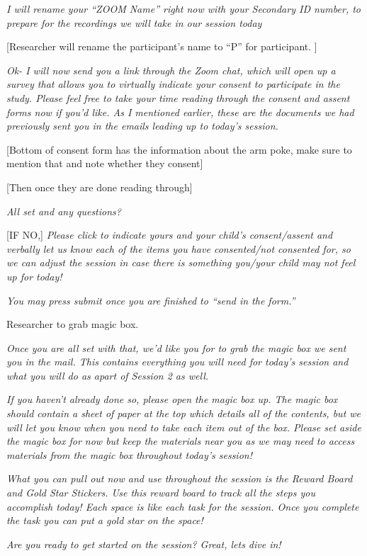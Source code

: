 \documentclass[
]{book}
\begin{document}
\emph{I will rename your ``ZOOM Name'' right now with your Secondary ID number, to prepare for the recordings we will take in our session today}

{[}Researcher will rename the participant's name to ``P'' for participant. {]}

\emph{Ok- I will now send you a link through the Zoom chat, which will open up a survey that allows you to virtually indicate your consent to participate in the study. Please feel free to take your time reading through the consent and assent forms now if you'd like. As I mentioned earlier, these are the documents we had previously sent you in the emails leading up to today's session.}

{[}Bottom of consent form has the information about the arm poke, make sure to mention that and note whether they consent{]}

{[}Then once they are done reading through{]}

\emph{All set and any questions?}

{[}IF NO,{]} \emph{Please click to indicate yours and your child's consent/assent and verbally let us know each of the items you have consented/not consented for, so we can adjust the session in case there is something you/your child may not feel up for today!}

\emph{You may press submit once you are finished to ``send in the form.''}

Researcher to grab magic box.

\emph{Once you are all set with that, we'd like you for to grab the magic box we sent you in the mail. This contains everything you will need for today's session and what you will do as apart of Session 2 as well.}

\emph{If you haven't already done so, please open the magic box up. The magic box should contain a sheet of paper at the top which details all of the contents, but we will let you know when you need to take each item out of the box. Please set aside the magic box for now but keep the materials near you as we may need to access materials from the magic box throughout today's session!}

\emph{What you can pull out now and use throughout the session is the Reward Board and Gold Star Stickers. Use this reward board to track all the steps you accomplish today! Each space is like each task for the session. Once you complete the task you can put a gold star on the space!}

\emph{Are you ready to get started on the session? Great, lets dive in!}
\end{document}
